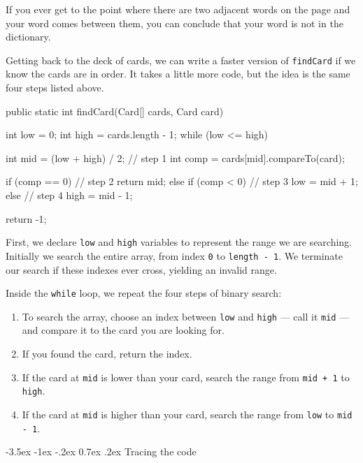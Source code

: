 \documentclass[12pt]{book}
\makeatletter
\theoremstyle{exercise}
\newcommand{\java}[1]{\verb"#1"}
\renewcommand{\section}{\@startsection{section}{1}{\z@}%
    {-3.5ex \@plus -1ex \@minus -.2ex}%
    {0.7ex \@plus.2ex}%
    {\normalfont\Large\bfseries}}
\newcommand{\java}[1]{\lstinline{#1}} %
\makeatother
\begin{document}
If you ever get to the point where there are two adjacent words on the page and your word comes between them, you can conclude that your word is not in the dictionary.

Getting back to the deck of cards, we can write a faster version of \java{findCard} if we know the cards are in order.
It takes a little more code, but the idea is the same four steps listed above.

\begin{code}
public static int findCard(Card[] cards, Card card) {
    int low = 0;
    int high = cards.length - 1;
    while (low <= high) {
        int mid = (low + high) / 2;                   // step 1
        int comp = cards[mid].compareTo(card);
        
        if (comp == 0) {                              // step 2
            return mid;
        } else if (comp < 0) {                        // step 3
            low = mid + 1;
        } else {                                      // step 4
            high = mid - 1;
        }
    }
    return -1;
}
\end{code}

First, we declare \java{low} and \java{high} variables to represent the range we are searching.
Initially we search the entire array, from index \java{0} to \java{length - 1}.
We terminate our search if these indexes ever cross, yielding an invalid range.

Inside the \java{while} loop, we repeat the four steps of binary search:

\begin{enumerate}

\item To search the array, choose an index between \java{low} and \java{high} --- call it \java{mid} --- and compare it to the card you are looking for.

\item If you found the card, return the index.

\item If the card at \java{mid} is lower than your card, search the range from \java{mid + 1} to \java{high}.

\item If the card at \java{mid} is higher than your card, search the range from \java{low} to \java{mid - 1}.

\end{enumerate}


\section{Tracing the code}
\end{document}
